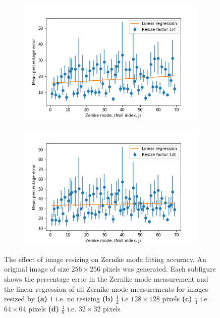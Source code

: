 \begin{figure}[h]
	\begin{subfigure}{0.48\textwidth}
		\centering
		\includegraphics[width=\linewidth]{images/Zernike_fitting_percentage_error_random_modes_repeat_resize_factor_4.png}
		\caption{}
		\label{fig:Zernike_fitting_percentage_error_random_modes_repeat_resize_factor_4}
	\end{subfigure}
	\begin{subfigure}{0.48\textwidth}
		\centering
		\includegraphics[width=\linewidth]{images/Zernike_fitting_percentage_error_random_modes_repeat_resize_factor_8.png}
		\caption{}
		\label{fig:Zernike_fitting_percentage_error_random_modes_repeat_resize_factor_8}
	\end{subfigure}
	\caption[The effect of image resizing on Zernike mode fitting 
	accuracy]{The effect of image resizing on Zernike mode fitting 
		accuracy. An original image of size $256\times256$ pixels was 
		generated. Each subfigure shows the percentage error in the Zernike 
		mode measurement and the linear regression of all Zernike mode 
		measurements for images resized by \textbf{(a)} $1$ i.e. no 
		resizing \textbf{(b)} $\frac{1}{2}$ i.e $128\times128$ pixels 
		\textbf{(c)} $\frac{1}{4}$ i.e $64\times64$ pixels \textbf{(d)} 
		$\frac{1}{8}$ i.e. $32\times32$ pixels}
	\label{fig:zernike_fitting_accuracy_resize}
\end{figure}

